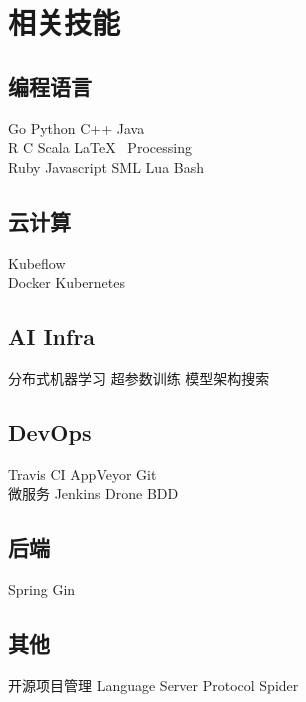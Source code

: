 \documentclass[]{deedy-resume-openfont}
\begin{document}
\begin{minipage}[t]{0.3\textwidth}


\section{相关技能}
\sectionsep
\subsection{编程语言}
Go \textbullet{} Python \textbullet{} C++ \textbullet{} Java \\
R \textbullet{} C \textbullet{} Scala \textbullet{} \LaTeX\ \textbullet{} Processing \\
Ruby \textbullet{} Javascript \textbullet{} SML \textbullet{} Lua \textbullet{} Bash \\
\sectionsep

\subsection{云计算}
Kubeflow  \\
Docker \textbullet{} Kubernetes \\
\sectionsep

\subsection{AI Infra}
分布式机器学习 \textbullet{} 超参数训练 \textbullet{} 模型架构搜索 \\
\sectionsep

\subsection{DevOps}
Travis CI \textbullet{} AppVeyor \textbullet{} Git \\
微服务 \textbullet{} Jenkins \textbullet{} Drone \textbullet{} BDD \\
\sectionsep

\subsection{后端}
Spring \textbullet{} Gin \\
\sectionsep

\subsection{其他}
开源项目管理 \textbullet{} Language Server Protocol \textbullet{} Spider \\
\sectionsep

\end{minipage}
\end{document}
